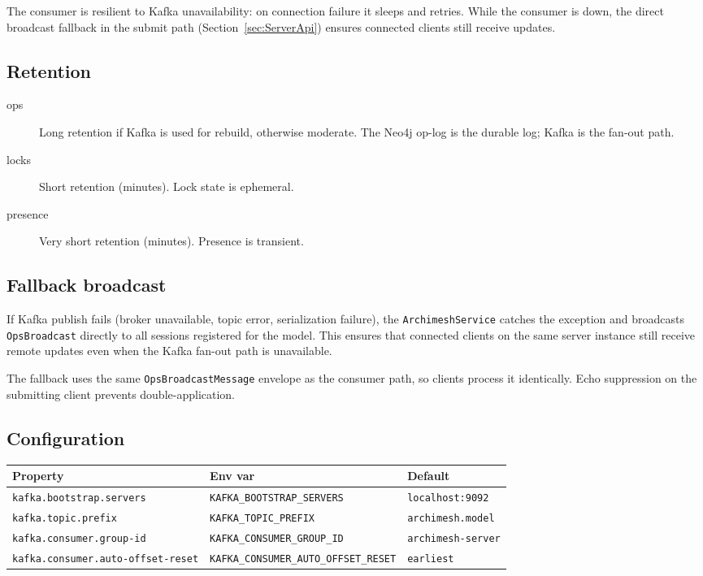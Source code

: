 The consumer is resilient to Kafka unavailability: on connection failure it
sleeps and retries. While the consumer is down, the direct broadcast fallback
in the submit path (Section~\ref{sec:ServerApi}) ensures connected clients
still receive updates.

\subsection{Retention}

\begin{description}
\item[ops] Long retention if Kafka is used for rebuild, otherwise moderate.
  The Neo4j op-log is the durable log; Kafka is the fan-out path.
\item[locks] Short retention (minutes). Lock state is ephemeral.
\item[presence] Very short retention (minutes). Presence is transient.
\end{description}

\subsection{Fallback broadcast}

If Kafka publish fails (broker unavailable, topic error, serialization
failure), the \texttt{ArchimeshService} catches the exception and broadcasts
\texttt{OpsBroadcast} directly to all sessions registered for the model. This
ensures that connected clients on the same server instance still receive
remote updates even when the Kafka fan-out path is unavailable.

The fallback uses the same \texttt{OpsBroadcastMessage} envelope as the
consumer path, so clients process it identically. Echo suppression on the
submitting client prevents double-application.

\subsection{Configuration}

\begin{longtable}{p{50mm}p{54mm}p{50mm}}
\toprule
Property & Env var & Default \\
\midrule
\texttt{kafka.bootstrap.servers} & \texttt{KAFKA\_BOOTSTRAP\_SERVERS} &
  \texttt{localhost:9092} \\
\texttt{kafka.topic.prefix} & \texttt{KAFKA\_TOPIC\_PREFIX} &
  \texttt{archimesh.model} \\
\texttt{kafka.consumer.group-id} & \texttt{KAFKA\_CONSUMER\_GROUP\_ID} &
  \texttt{archimesh-server} \\
\texttt{kafka.consumer.auto-offset-reset} &
  \texttt{KAFKA\_CONSUMER\_AUTO\_OFFSET\_RESET} &
  \texttt{earliest} \\
\bottomrule
\end{longtable}
